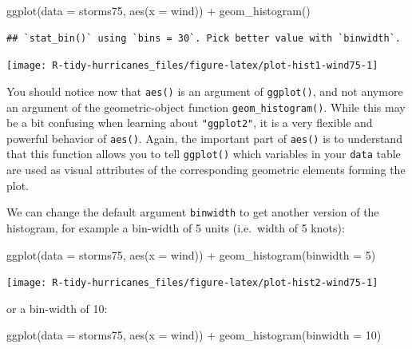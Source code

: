 \documentclass[
]{book}
\newenvironment{Shaded}{\begin{snugshade}}{\end{snugshade}}
\newcommand{\AttributeTok}[1]{\textcolor[rgb]{0.77,0.63,0.00}{#1}}
\newcommand{\DecValTok}[1]{\textcolor[rgb]{0.00,0.00,0.81}{#1}}
\newcommand{\FunctionTok}[1]{\textcolor[rgb]{0.00,0.00,0.00}{#1}}
\newcommand{\NormalTok}[1]{#1}
\newcommand{\SpecialCharTok}[1]{\textcolor[rgb]{0.00,0.00,0.00}{#1}}
\begin{document}
\begin{Shaded}
\begin{Highlighting}[]
\FunctionTok{ggplot}\NormalTok{(}\AttributeTok{data =}\NormalTok{ storms75, }\FunctionTok{aes}\NormalTok{(}\AttributeTok{x =}\NormalTok{ wind)) }\SpecialCharTok{+}
  \FunctionTok{geom\_histogram}\NormalTok{()}
\end{Highlighting}
\end{Shaded}

\begin{verbatim}
## `stat_bin()` using `bins = 30`. Pick better value with `binwidth`.
\end{verbatim}

\begin{center}\texttt{[image: R-tidy-hurricanes\_files/figure-latex/plot-hist1-wind75-1]} \end{center}

You should notice now that \texttt{aes()} is an argument of \texttt{ggplot()}, and not anymore
an argument of the geometric-object function \texttt{geom\_histogram()}. While this
may be a bit confusing when learning about \texttt{"ggplot2"}, it is a very flexible
and powerful behavior of \texttt{aes()}. Again, the important part of \texttt{aes()} is to
understand that this function allows you to tell \texttt{ggplot()} which variables
in your \texttt{data} table are used as visual attributes of the corresponding
geometric elements forming the plot.

We can change the default argument \texttt{binwidth} to get another version of the
histogram, for example a bin-width of 5 units (i.e.~width of 5 knots):

\begin{Shaded}
\begin{Highlighting}[]
\FunctionTok{ggplot}\NormalTok{(}\AttributeTok{data =}\NormalTok{ storms75, }\FunctionTok{aes}\NormalTok{(}\AttributeTok{x =}\NormalTok{ wind)) }\SpecialCharTok{+}
  \FunctionTok{geom\_histogram}\NormalTok{(}\AttributeTok{binwidth =} \DecValTok{5}\NormalTok{)}
\end{Highlighting}
\end{Shaded}

\begin{center}\texttt{[image: R-tidy-hurricanes\_files/figure-latex/plot-hist2-wind75-1]} \end{center}

or a bin-width of 10:

\begin{Shaded}
\begin{Highlighting}[]
\FunctionTok{ggplot}\NormalTok{(}\AttributeTok{data =}\NormalTok{ storms75, }\FunctionTok{aes}\NormalTok{(}\AttributeTok{x =}\NormalTok{ wind)) }\SpecialCharTok{+}
  \FunctionTok{geom\_histogram}\NormalTok{(}\AttributeTok{binwidth =} \DecValTok{10}\NormalTok{)}
\end{Highlighting}
\end{Shaded}
\end{document}
